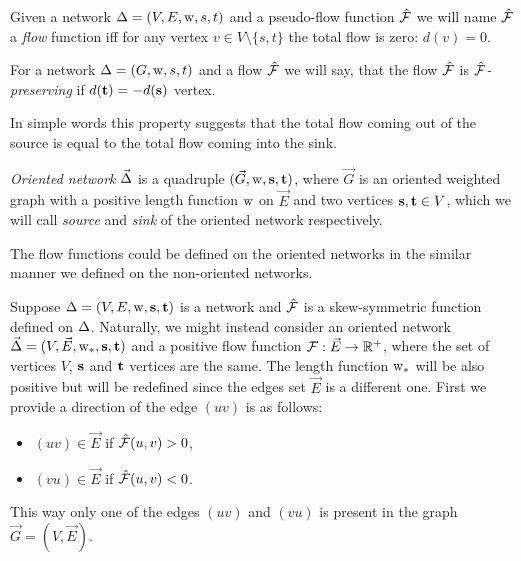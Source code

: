 \documentclass[12pt]{article}
\begin{document}
    \begin{definition}
      Given a network $\Delta = (V, E, \mathrm{w}, s, t)$ and a pseudo-flow function $\mathcal{\hat{F}}$ we will name $\mathcal{\hat{F}}$ a
        \emph{flow} function iff for any vertex $v \in V \setminus \{s,t\}$ the total flow is zero: $d(v) = 0$.
    \end{definition}
    \begin{definition}
      For a network $\Delta = (G, \mathrm{w}, s, t)$ and a flow $\mathcal{\hat{F}}$ we will say,
      that the flow $\mathcal{\hat{F}}$ is \emph{$\mathcal{\hat{F}}$-preserving} if $d(\mathbf{t}) = -d(\mathbf{s})$ vertex.
    \end{definition}
    \begin{note}
      In simple words this property suggests
        that the total flow coming out of the source is equal to the total flow
        coming into the sink.
    \end{note}
    \begin{definition}
      \emph{Oriented network} $\vec{\Delta}$ is a quadruple $(\vec{G}, \mathrm{w}, \mathbf{s}, \mathbf{t})$, where
        $\vec{G}$ is an oriented weighted graph with
        a positive length function $\mathrm{w}$ on $\vec{E}$ and two vertices $\mathbf{s}, \mathbf{t} \in V$, which
        we will call \emph{source} and \emph{sink} of the oriented network respectively.
    \end{definition}
    \begin{note}
      The flow functions could be defined on the oriented networks in the similar manner
      we defined on the non-oriented networks.
    \end{note}
    Suppose $\Delta = (V, E, \mathrm{w}, \mathbf{s}, \mathbf{t})$ is a network and $\mathcal{\hat{F}}$ is a skew-symmetric function defined
    on $\Delta$.
    Naturally, we might instead consider an oriented network $\vec{\Delta} = (V, \vec{E}, \mathrm{w}_{*}, \mathbf{s}, \mathbf{t})$ and a 
      positive flow function $\mathcal{F}: \vec{E} \to \mathbb{R}^{+}$, where
      the set of vertices $V$, $\mathbf{s}$ and $\mathbf{t}$ vertices are the same.
    The length function $\mathrm{w}_{*}$ will be also positive but will be redefined since the edges set $\vec{E}$ is a different one.
    First we provide a direction of the edge $(uv)$ is as follows:
    \begin{itemize}
      \item $(uv) \in \vec{E}$ if $\mathcal{\hat{F}}(u, v) > 0$,
      \item $(vu) \in \vec{E}$ if $\mathcal{\hat{F}}(u, v) < 0$.
    \end{itemize}
    This way only one of the edges $(uv)$ and $(vu)$ is present in the graph $\vec{G} = (V, \vec{E})$.
\end{document}
